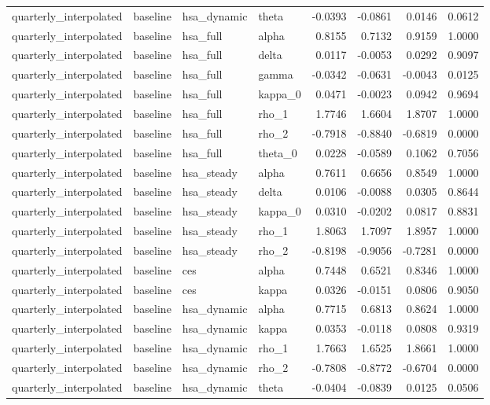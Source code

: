 \begin{tabular}{llllrrrr}
quarterly\_interpolated & baseline & hsa\_dynamic & theta & -0.0393 & -0.0861 & 0.0146 & 0.0612 \\
quarterly\_interpolated & baseline & hsa\_full & alpha & 0.8155 & 0.7132 & 0.9159 & 1.0000 \\
quarterly\_interpolated & baseline & hsa\_full & delta & 0.0117 & -0.0053 & 0.0292 & 0.9097 \\
quarterly\_interpolated & baseline & hsa\_full & gamma & -0.0342 & -0.0631 & -0.0043 & 0.0125 \\
quarterly\_interpolated & baseline & hsa\_full & kappa\_0 & 0.0471 & -0.0023 & 0.0942 & 0.9694 \\
quarterly\_interpolated & baseline & hsa\_full & rho\_1 & 1.7746 & 1.6604 & 1.8707 & 1.0000 \\
quarterly\_interpolated & baseline & hsa\_full & rho\_2 & -0.7918 & -0.8840 & -0.6819 & 0.0000 \\
quarterly\_interpolated & baseline & hsa\_full & theta\_0 & 0.0228 & -0.0589 & 0.1062 & 0.7056 \\
quarterly\_interpolated & baseline & hsa\_steady & alpha & 0.7611 & 0.6656 & 0.8549 & 1.0000 \\
quarterly\_interpolated & baseline & hsa\_steady & delta & 0.0106 & -0.0088 & 0.0305 & 0.8644 \\
quarterly\_interpolated & baseline & hsa\_steady & kappa\_0 & 0.0310 & -0.0202 & 0.0817 & 0.8831 \\
quarterly\_interpolated & baseline & hsa\_steady & rho\_1 & 1.8063 & 1.7097 & 1.8957 & 1.0000 \\
quarterly\_interpolated & baseline & hsa\_steady & rho\_2 & -0.8198 & -0.9056 & -0.7281 & 0.0000 \\
quarterly\_interpolated & baseline & ces & alpha & 0.7448 & 0.6521 & 0.8346 & 1.0000 \\
quarterly\_interpolated & baseline & ces & kappa & 0.0326 & -0.0151 & 0.0806 & 0.9050 \\
quarterly\_interpolated & baseline & hsa\_dynamic & alpha & 0.7715 & 0.6813 & 0.8624 & 1.0000 \\
quarterly\_interpolated & baseline & hsa\_dynamic & kappa & 0.0353 & -0.0118 & 0.0808 & 0.9319 \\
quarterly\_interpolated & baseline & hsa\_dynamic & rho\_1 & 1.7663 & 1.6525 & 1.8661 & 1.0000 \\
quarterly\_interpolated & baseline & hsa\_dynamic & rho\_2 & -0.7808 & -0.8772 & -0.6704 & 0.0000 \\
quarterly\_interpolated & baseline & hsa\_dynamic & theta & -0.0404 & -0.0839 & 0.0125 & 0.0506 \\

\end{tabular}
